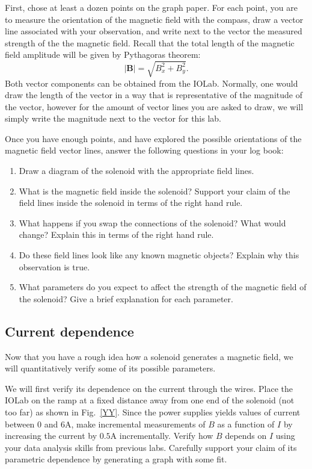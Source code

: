 \documentclass[12pt]{report}
\begin{document}
First, chose at least a dozen points on the graph paper. For each point, you are to measure the orientation of the magnetic field with the compass, draw a vector line associated with your observation, and write next to the vector the measured strength of the the magnetic field. Recall that the total length of the magnetic field amplitude will be given by Pythagoras theorem:
\begin{equation}
| \mathbf{B} | = \sqrt{B_x^2 +B_y^2}.
\end{equation}
Both vector components can be obtained from the IOLab. Normally, one would draw the length of the vector in a way that is representative of the magnitude of the vector, however for the amount of vector lines you are asked to draw, we will simply write the magnitude next to the vector for this lab.

Once you have enough points, and have explored the possible orientations of the magnetic field vector lines, answer the following questions in your log book:
\begin{enumerate}
\item Draw a diagram of the solenoid with the appropriate field lines.
\item What is the magnetic field inside the solenoid? Support your claim of the field lines inside the solenoid in terms of the right hand rule.
\item What happens if you swap the connections of the solenoid? What would change? Explain this in terms of the right hand rule.
\item Do these field lines look like any known magnetic objects? Explain why this observation is true.
\item What parameters do you expect to affect the strength of the magnetic field of the solenoid? Give a brief explanation for each parameter.
\end{enumerate}

\subsection{Current dependence}
Now that you have a rough idea how a solenoid generates a magnetic field, we will quantitatively verify some of its possible parameters.

We will first verify its dependence on the current through the wires. Place the IOLab on the ramp at a fixed distance away from one end of the solenoid (not too far) as shown in Fig.~\ref{YY}. Since the power supplies yields values of current between 0 and 6A, make incremental measurements of $B$ as a function of $I$ by increasing the current by $0.5$A incrementally. Verify how $B$ depends on $I$ using your data analysis skills from previous labs. Carefully support your claim of its parametric dependence by generating a graph with some fit. 
\end{document}
